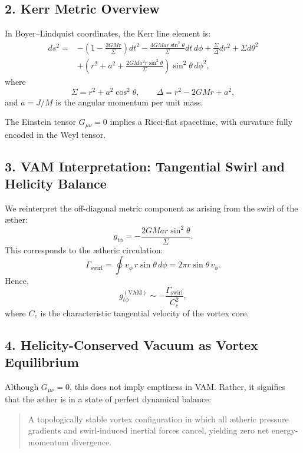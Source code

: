 \documentclass[twocolumn,aps,pre,floatfix,nofootinbib]{revtex4-2}
\begin{document}
    \subsection*{2. Kerr Metric Overview}
    In Boyer--Lindquist coordinates, the Kerr line element is:
    \begin{equation}
        \begin{aligned}
            ds^2 = & -\left(1 - \frac{2 G M r}{\Sigma} \right) dt^2 - \frac{4 G M a r \sin^2\theta}{\Sigma} dt\, d\phi + \frac{\Sigma}{\Delta} dr^2 + \Sigma d\theta^2 \\
            & + \left(r^2 + a^2 + \frac{2 G M a^2 r \sin^2\theta}{\Sigma} \right) \sin^2\theta\, d\phi^2,
        \end{aligned}
    \end{equation}
    where
    \[
        \Sigma = r^2 + a^2 \cos^2\theta, \qquad \Delta = r^2 - 2 G M r + a^2,
    \]
    and \( a = J/M \) is the angular momentum per unit mass.

    The Einstein tensor \( G_{\mu\nu} = 0 \) implies a Ricci-flat spacetime, with curvature fully encoded in the Weyl tensor.

    \subsection*{3. VAM Interpretation: Tangential Swirl and Helicity Balance}
    We reinterpret the off-diagonal metric component as arising from the swirl of the æther:
    \begin{equation}
        g_{t\phi} = -\frac{2 G M a r \sin^2\theta}{\Sigma}.
    \end{equation}
    This corresponds to the ætheric circulation:
    \begin{equation}
        \Gamma_{\text{swirl}} = \oint v_\phi\, r \sin\theta\, d\phi = 2\pi r \sin\theta\, v_\phi.
    \end{equation}
    Hence,
    \begin{equation}
        g_{t\phi}^{(\text{VAM})} \sim -\frac{\Gamma_{\text{swirl}}}{C_e^2},
    \end{equation}
    where \( C_e \) is the characteristic tangential velocity of the vortex core.

    \subsection*{4. Helicity-Conserved Vacuum as Vortex Equilibrium}
    Although \( G_{\mu\nu} = 0 \), this does not imply emptiness in VAM. Rather, it signifies that the æther is in a state of perfect dynamical balance:
    \begin{quote}
        A topologically stable vortex configuration in which all ætheric pressure gradients and swirl-induced inertial forces cancel, yielding zero net energy-momentum divergence.
    \end{quote}
\end{document}
